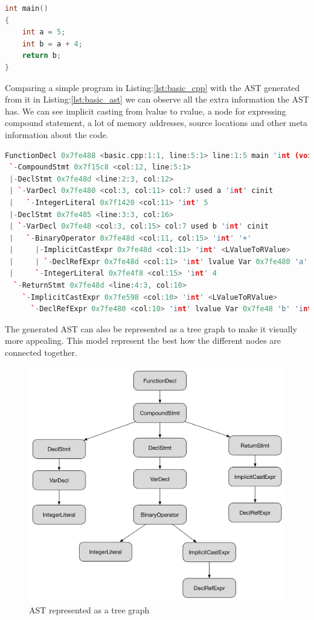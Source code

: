 \begin{lstlisting}[language=c++,frame=single, caption={A simple C++ program}, label={lst:basic_cpp}]
int main() 
{
	int a = 5;
	int b = a + 4;
	return b;
}
\end{lstlisting}
\par Comparing a simple program in Listing:\ref{lst:basic_cpp} with the AST generated from it in Listing:\ref{lst:basic_ast} we can observe all the extra information the AST has. We can see implicit casting from lvalue to rvalue, a node for expressing compound statement, a lot of memory addresses, source locations and other meta information about the code.
\begin{lstlisting}[language=c++,frame=single, caption={AST generated}, style=ast, label={lst:basic_ast}]
FunctionDecl 0x7fe488 <basic.cpp:1:1, line:5:1> line:1:5 main 'int (void)'
 `-CompoundStmt 0x7f15c8 <col:12, line:5:1>
 |-DeclStmt 0x7fe48d <line:2:3, col:12>
 | `-VarDecl 0x7fe480 <col:3, col:11> col:7 used a 'int' cinit
 |   `-IntegerLiteral 0x7f1420 <col:11> 'int' 5
 |-DeclStmt 0x7fe485 <line:3:3, col:16>
 | `-VarDecl 0x7fe48 <col:3, col:15> col:7 used b 'int' cinit
 |   `-BinaryOperator 0x7fe48d <col:11, col:15> 'int' '+'
 |     |-ImplicitCastExpr 0x7fe48d <col:11> 'int' <LValueToRValue>
 |     | `-DeclRefExpr 0x7fe48d <col:11> 'int' lvalue Var 0x7fe480 'a' 'int'
 |     `-IntegerLiteral 0x7fe4f8 <col:15> 'int' 4
  `-ReturnStmt 0x7fe48d <line:4:3, col:10>
    `-ImplicitCastExpr 0x7fe598 <col:10> 'int' <LValueToRValue>
      `-DeclRefExpr 0x7fe480 <col:10> 'int' lvalue Var 0x7fe48 'b' 'int'
\end{lstlisting}
\par The generated AST can also be represented as a tree graph to make it visually more appealing. This model represent the best how the different nodes are connected together.
\pagebreak
\begin{figure}[h]
	\centering
	\caption{AST represented as a tree graph}
	\includegraphics[scale = 0.4]{images/ast_diagram}
\end{figure}